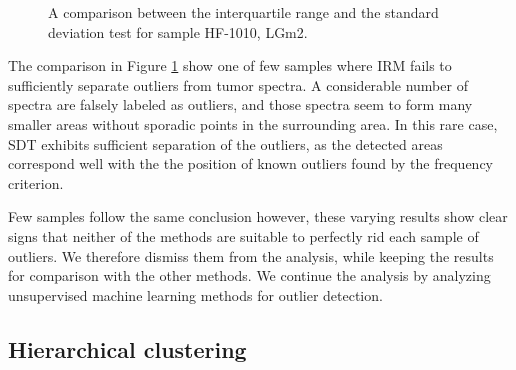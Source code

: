 \begin{figure}[h]

    \centering
    \qquad
    \caption{A comparison between the interquartile range and the standard deviation test for sample HF-1010, LGm2.
\label{fig:HF1010comp}}%
\end{figure}

The comparison in Figure \ref{fig:HF1010comp} show one of few samples where IRM fails to sufficiently separate outliers from tumor spectra. A considerable number of spectra are falsely labeled as outliers, and those spectra seem to form many smaller areas without sporadic points in the surrounding area. In this rare case, SDT exhibits sufficient separation of the outliers, as the detected areas correspond well with the the position of known outliers found by the frequency criterion.

Few samples follow the same conclusion however, these varying results show clear signs that neither of the methods are suitable to perfectly rid each sample of outliers. We therefore dismiss them from the analysis, while keeping the results for comparison with the other methods. We continue the analysis by analyzing unsupervised machine learning methods for outlier detection.

\subsection{Hierarchical clustering}

